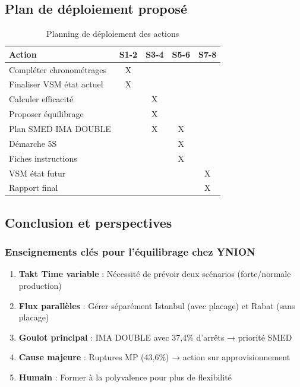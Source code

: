 \documentclass[12pt,a4paper]{article}
\begin{document}
\begin{center}
\subsection{Plan de déploiement proposé}

\begin{table}[H]
\centering
\caption{Planning de déploiement des actions}
\label{tab:ynion_planning}
\begin{tabular}{|l|c|c|c|c|}
\hline
\textbf{Action} & \textbf{S1-2} & \textbf{S3-4} & \textbf{S5-6} & \textbf{S7-8} \\ \hline
Compléter chronométrages & X & & & \\ \hline
Finaliser VSM état actuel & X & & & \\ \hline
Calculer efficacité & & X & & \\ \hline
Proposer équilibrage & & X & & \\ \hline
Plan SMED IMA DOUBLE & & X & X & \\ \hline
Démarche 5S & & & X & \\ \hline
Fiches instructions & & & X & \\ \hline
VSM état futur & & & & X \\ \hline
Rapport final & & & & X \\ \hline
\end{tabular}
\end{table}

\subsection{Conclusion et perspectives}

\subsubsection{Enseignements clés pour l'équilibrage chez YNION}

\begin{enumerate}
    \item \textbf{Takt Time variable} : Nécessité de prévoir deux scénarios (forte/normale production)
    \item \textbf{Flux parallèles} : Gérer séparément Istanbul (avec placage) et Rabat (sans placage)
    \item \textbf{Goulot principal} : IMA DOUBLE avec 37,4\% d'arrêts → priorité SMED
    \item \textbf{Cause majeure} : Ruptures MP (43,6\%) → action sur approvisionnement
    \item \textbf{Humain} : Former à la polyvalence pour plus de flexibilité
\end{enumerate}


\end{center}
\end{document}
